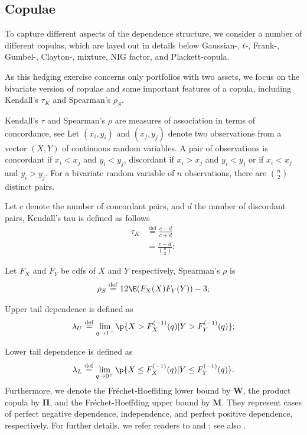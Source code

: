 
\subsection{Copulae}\label{subsec:copulae}
To capture different aspects of the dependence structure, we consider a number of different copulas, which are layed
  out in details below \medskip
Gaussian-, $t$-, Frank-,
Gumbel-, Clayton-, mixture, NIG factor, and Plackett-copula. \medskip

As this hedging exercise concerns only portfolios with two assets, we
focus on the bivariate version of copulae and some important
features of a copula, including Kendall's $\tau_K$ and Spearman's $\rho_S$. \medskip

Kendall's $\tau$ and Spearman's $\rho$ are measures of association in terms of concordance, see \cite{kruskal1958ordinal}
Let $(x_i, y_i)$ and $(x_j, y_j)$ denote two observations from a vector $(X, Y)$ of continuous random variables.
A pair of observations is concordant if $x_i<x_j$ and $y_i < y_j$, discordant if
$x_i>x_j$ and $y_i < y_j$ or if $x_i<x_j$ and $y_i>y_j$.
For a bivariate random variable of $n$ observations, there are $\binom{n}{2}$ distinct pairs. \medskip

Let $c$ denote the number of concordant pairs, and $d$ the number of discordant pairs,
Kendall's tau is defined as follows \citep{Nelsen1999}
\begin{align*}
\tau_K &\overset{\mathrm{def}}{=} \frac{c-d}{c+d} \\[10pt]
     &= \frac{c-d}{\binom{n}{2}};
\end{align*}

Let $F_X$ and $F_Y$ be cdfs of $X$ and $Y$ respectively, Spearman's $\rho$ is
\begin{align*}
\rho_S \overset{\mathrm{def}}{=} 12\E (F_X(X)F_Y(Y))-3;
\end{align*}

Upper tail dependence is defined as
\begin{equation*}
\lambda_U \overset{\mathrm{def}}{=}  \lim_{q
  \rightarrow 1^-} \p\{X > F_{X}^{(-1)}(q)|Y > F_{Y}^{(-1)}(q)\};
\end{equation*}

Lower tail dependence is defined as
\begin{equation*}
\lambda_L \overset{\mathrm{def}}{=}  \lim_{q
  \rightarrow 0^+} \p\{X \leq F_{X}^{(-1)}(q)|Y \leq
F_{Y}^{(-1)}(q)\}. 
\end{equation*}
Furthermore, we denote the Fr{\'e}chet-Hoeffding lower bound by
$\bm{W}$, the product copula by $\bm{\Pi}$, and the Fr{\'e}chet-Hoeffding
upper bound by $\bm{M}$. They represent cases of perfect negative
dependence, independence, and perfect positive dependence,
respectively. 
For further details, we refer readers to \citet{joe1997multivariate}
and \citet{Nelsen1999}; see also \citet{hardle2010copulis}. \medskip

